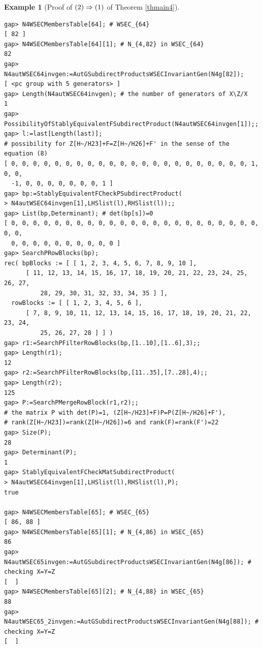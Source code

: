 \documentclass{amsart}
\theoremstyle{plain}
\theoremstyle{definition}
\newtheorem{example}[theorem]{Example}
\theoremstyle{remark}
\begin{document}
\begin{example}[Proof of ${\rm (2)}\Rightarrow {\rm (1)}$ of {Theorem \ref{thmain4}}]
\begin{verbatim}
gap> N4WSECMembersTable[64]; # WSEC_{64}
[ 82 ]
gap> N4WSECMembersTable[64][1]; # N_{4,82} in WSEC_{64}
82
gap> N4autWSEC64invgen:=AutGSubdirectProductsWSECInvariantGen(N4g[82]);
[ <pc group with 5 generators> ]
gap> Length(N4autWSEC64invgen); # the number of generators of X\Z/X
1
gap> PossibilityOfStablyEquivalentFSubdirectProduct(N4autWSEC64invgen[1]);;
gap> l:=last[Length(last)]; 
# possibility for Z[H~/H23]+F=Z[H~/H26]+F' in the sense of the equation (8)
[ 0, 0, 0, 0, 0, 0, 0, 0, 0, 0, 0, 0, 0, 0, 0, 0, 0, 0, 0, 0, 0, 0, 1, 0, 0, 
  -1, 0, 0, 0, 0, 0, 0, 0, 1 ]
gap> bp:=StablyEquivalentFCheckPSubdirectProduct(
> N4autWSEC64invgen[1],LHSlist(l),RHSlist(l));;
gap> List(bp,Determinant); # det(bp[s])=0
[ 0, 0, 0, 0, 0, 0, 0, 0, 0, 0, 0, 0, 0, 0, 0, 0, 0, 0, 0, 0, 0, 0, 0, 0, 0, 
  0, 0, 0, 0, 0, 0, 0, 0, 0, 0 ]
gap> SearchPRowBlocks(bp);
rec( bpBlocks := [ [ 1, 2, 3, 4, 5, 6, 7, 8, 9, 10 ], 
      [ 11, 12, 13, 14, 15, 16, 17, 18, 19, 20, 21, 22, 23, 24, 25, 26, 27, 
          28, 29, 30, 31, 32, 33, 34, 35 ] ], 
  rowBlocks := [ [ 1, 2, 3, 4, 5, 6 ], 
      [ 7, 8, 9, 10, 11, 12, 13, 14, 15, 16, 17, 18, 19, 20, 21, 22, 23, 24, 
          25, 26, 27, 28 ] ] )
gap> r1:=SearchPFilterRowBlocks(bp,[1..10],[1..6],3);;
gap> Length(r1);
12
gap> r2:=SearchPFilterRowBlocks(bp,[11..35],[7..28],4);;
gap> Length(r2);
125
gap> P:=SearchPMergeRowBlock(r1,r2);;
# the matrix P with det(P)=1, (Z[H~/H23]+F)P=P(Z[H~/H26]+F'), 
# rank(Z[H~/H23])=rank(Z[H~/H26])=6 and rank(F)=rank(F')=22
gap> Size(P);
28
gap> Determinant(P);
1
gap> StablyEquivalentFCheckMatSubdirectProduct(
> N4autWSEC64invgen[1],LHSlist(l),RHSlist(l),P);
true

gap> N4WSECMembersTable[65]; # WSEC_{65}
[ 86, 88 ]
gap> N4WSECMembersTable[65][1]; # N_{4,86} in WSEC_{65}
86
gap> N4autWSEC65invgen:=AutGSubdirectProductsWSECInvariantGen(N4g[86]); # checking X=Y=Z
[  ]
gap> N4WSECMembersTable[65][2]; # N_{4,88} in WSEC_{65}
88
gap> N4autWSEC65_2invgen:=AutGSubdirectProductsWSECInvariantGen(N4g[88]); # checking X=Y=Z
[  ]


\end{verbatim}
\end{example}
\end{document}
